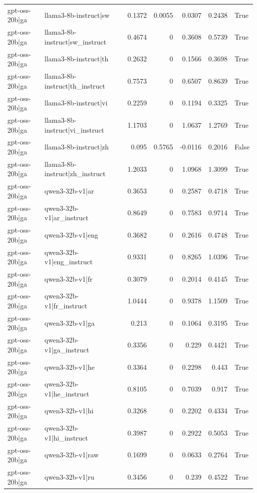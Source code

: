\begin{table}
\begin{tabular}{l l r r r r l}
gpt-oss-20b|ga & llama3-8b-instruct|sw & 0.1372 & 0.0055 & 0.0307 & 0.2438 & True \\
gpt-oss-20b|ga & llama3-8b-instruct|sw_instruct & 0.4674 & 0 & 0.3608 & 0.5739 & True \\
gpt-oss-20b|ga & llama3-8b-instruct|th & 0.2632 & 0 & 0.1566 & 0.3698 & True \\
gpt-oss-20b|ga & llama3-8b-instruct|th_instruct & 0.7573 & 0 & 0.6507 & 0.8639 & True \\
gpt-oss-20b|ga & llama3-8b-instruct|vi & 0.2259 & 0 & 0.1194 & 0.3325 & True \\
gpt-oss-20b|ga & llama3-8b-instruct|vi_instruct & 1.1703 & 0 & 1.0637 & 1.2769 & True \\
gpt-oss-20b|ga & llama3-8b-instruct|zh & 0.095 & 0.5765 & -0.0116 & 0.2016 & False \\
gpt-oss-20b|ga & llama3-8b-instruct|zh_instruct & 1.2033 & 0 & 1.0968 & 1.3099 & True \\
gpt-oss-20b|ga & qwen3-32b-v1|ar & 0.3653 & 0 & 0.2587 & 0.4718 & True \\
gpt-oss-20b|ga & qwen3-32b-v1|ar_instruct & 0.8649 & 0 & 0.7583 & 0.9714 & True \\
gpt-oss-20b|ga & qwen3-32b-v1|eng & 0.3682 & 0 & 0.2616 & 0.4748 & True \\
gpt-oss-20b|ga & qwen3-32b-v1|eng_instruct & 0.9331 & 0 & 0.8265 & 1.0396 & True \\
gpt-oss-20b|ga & qwen3-32b-v1|fr & 0.3079 & 0 & 0.2014 & 0.4145 & True \\
gpt-oss-20b|ga & qwen3-32b-v1|fr_instruct & 1.0444 & 0 & 0.9378 & 1.1509 & True \\
gpt-oss-20b|ga & qwen3-32b-v1|ga & 0.213 & 0 & 0.1064 & 0.3195 & True \\
gpt-oss-20b|ga & qwen3-32b-v1|ga_instruct & 0.3356 & 0 & 0.229 & 0.4421 & True \\
gpt-oss-20b|ga & qwen3-32b-v1|he & 0.3364 & 0 & 0.2298 & 0.443 & True \\
gpt-oss-20b|ga & qwen3-32b-v1|he_instruct & 0.8105 & 0 & 0.7039 & 0.917 & True \\
gpt-oss-20b|ga & qwen3-32b-v1|hi & 0.3268 & 0 & 0.2202 & 0.4334 & True \\
gpt-oss-20b|ga & qwen3-32b-v1|hi_instruct & 0.3987 & 0 & 0.2922 & 0.5053 & True \\
gpt-oss-20b|ga & qwen3-32b-v1|raw & 0.1699 & 0 & 0.0633 & 0.2764 & True \\
gpt-oss-20b|ga & qwen3-32b-v1|ru & 0.3456 & 0 & 0.239 & 0.4522 & True \\

\end{tabular}
\end{table}
